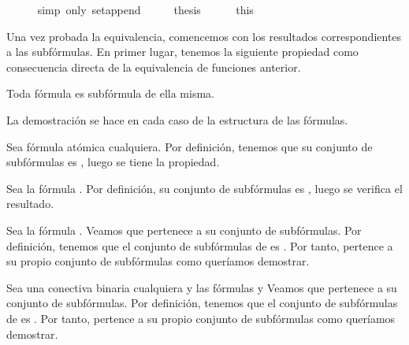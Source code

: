 \begin{isabellebody}
\ \ \ \ \isamarkupfalse%
\ {\isacharparenleft}simp\ only{\isacharcolon}\ set{\isacharunderscore}append{\isacharparenright}\isanewline
\ \ \isamarkupfalse%
\ \isamarkupfalse%
\ {\isacharquery}thesis\isanewline
\ \ \ \ \isamarkupfalse%
\ this\isanewline
{}\isamarkupfalse%
%
\endisatagproof
{\isafoldproof}%
%
\isadelimproof
%
\endisadelimproof
%
\begin{isamarkuptext}%
Una vez probada la equivalencia, comencemos con los resultados 
  correspondientes a las subfórmulas. En primer lugar, tenemos la 
  siguiente propiedad como consecuencia directa de la equivalencia de 
  funciones anterior.

  \begin{lema}
    Toda fórmula es subfórmula de ella misma.
  \end{lema}

  \begin{demostracion}
    La demostración se hace en cada caso de la estructura de las 
    fórmulas.
  
    Sea  fórmula atómica cualquiera. Por definición, tenemos que su
    conjunto de subfórmulas es , luego se tiene la propiedad.
  
    Sea la fórmula \isa{{\isasymbottom}}. Por definición, su conjunto de subfórmulas es
    \isa{{\isacharbraceleft}{\isasymbottom}{\isacharbraceright}}, luego se verifica el resultado.

    Sea la fórmula . Veamos que pertenece a su conjunto de
    subfórmulas.
    Por definición, tenemos que el conjunto de subfórmulas de  es
    . Por tanto,  pertence a su propio conjunto
    de subfórmulas como queríamos demostrar.

    Sea \isa{{\isacharasterisk}} una conectiva binaria cualquiera y las fórmulas  y 
    Veamos que  pertenece a su conjunto de subfórmulas.
    Por definición, tenemos que el conjunto de subfórmulas de  es
    . Por tanto,  pertence a su propio 
    conjunto de subfórmulas como queríamos demostrar.
  \end{demostracion}


\end{isamarkuptext}
\end{isabellebody}
